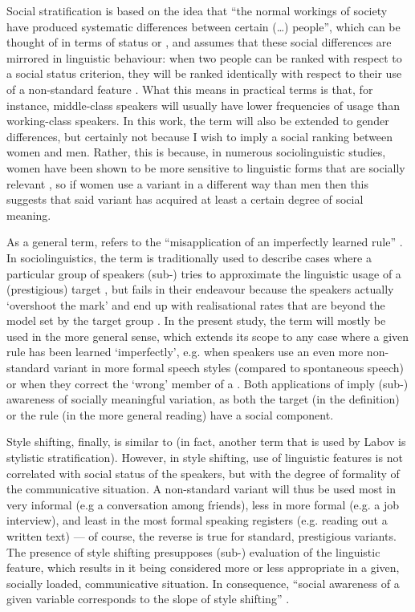 Social stratification is based on the idea that ``the normal workings of society have produced systematic differences between certain (\ldots) people'', which can be thought of in terms of status or , and assumes that these social differences are mirrored in linguistic behaviour: when two people can be ranked with respect to a social status criterion, they will be ranked identically with respect to their use of a non-standard feature \parencite[44--45]{labov1972}.
What this means in practical terms is that, for instance, middle-class speakers will usually have lower frequencies of usage than working-class speakers.
In this work, the term will also be extended to gender differences, but certainly not because I wish to imply a social ranking between women and men.
Rather, this is because, in numerous sociolinguistic studies, women have been shown to be more sensitive to linguistic forms that are socially relevant \parencite[cf.][290--291]{labov2001a}, so if women use a variant in a different way than men then this suggests that said variant has acquired at least a certain degree of social meaning.

As a general term,  refers to the ``misapplication of an imperfectly learned rule'' \parencite[126]{labov1972}.
In sociolinguistics, the term is traditionally used to describe cases where a particular group of speakers (sub-) tries to approximate the linguistic usage of a (prestigious) target , but fails in their endeavour because the speakers actually `overshoot the mark' and end up with realisational rates that are beyond the model set by the target group \parencite[cf.][126]{labov1972}.
In the present study, the term  will mostly be used in the more general sense, which extends its scope to any case where a given rule has been learned `imperfectly', e.g. when speakers use an even more non-standard variant in more formal speech styles (compared to spontaneous speech) or when they correct the `wrong' member of a .
Both applications of  imply (sub-) awareness of socially meaningful variation, as both the target (in the  definition) or the rule (in the more general reading) have a social component.

Style shifting, finally, is similar to  (in fact, another term that is used by Labov is stylistic stratification).
However, in style shifting, use of linguistic features is not correlated with social status of the speakers, but with the degree of formality of the communicative situation.
A non-standard variant will thus be used most in very informal (e.g a conversation among friends), less in more formal (e.g. a job interview), and least in the most formal speaking registers (e.g. reading out a written text) --- of course, the reverse is true for standard, prestigious variants.
The presence of style shifting presupposes (sub-) evaluation of the linguistic feature, which results in it being considered more or less appropriate in a given, socially loaded, communicative situation.
In consequence, ``social awareness of a given variable corresponds to the slope of style shifting'' \parencite[196]{labov2001a}.

